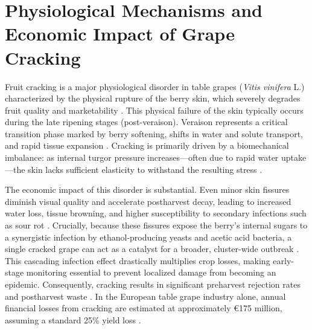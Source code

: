 \section{Physiological Mechanisms and Economic Impact of Grape Cracking}

\medskip
\noindent
Fruit cracking is a major physiological disorder in table grapes (\textit{Vitis vinifera} L.) characterized by the physical rupture of the berry skin, which severely degrades fruit quality and marketability \parencite{horticulturae11111320}. This physical failure of the skin typically occurs during the late ripening stages (post-veraison). Veraison represents a critical transition phase marked by berry softening, shifts in water and solute transport, and rapid tissue expansion \parencite{horticulturae11111320}. Cracking is primarily driven by a biomechanical imbalance: as internal turgor pressure increases---often due to rapid water uptake---the skin lacks sufficient elasticity to withstand the resulting stress \parencite{YU20251506, plants13172400}. 

\medskip
\noindent
The economic impact of this disorder is substantial. Even minor skin fissures diminish visual quality and accelerate postharvest decay, leading to increased water loss, tissue browning, and higher susceptibility to secondary infections such as sour rot \parencite{plants14162462, agronomy12102437}. Crucially, because these fissures expose the berry's internal sugars to a synergistic infection by ethanol-producing yeasts and acetic acid bacteria, a single cracked grape can act as a catalyst for a broader, cluster-wide outbreak \parencite{Hall2018}. This cascading infection effect drastically multiplies crop losses, making early-stage monitoring essential to prevent localized damage from becoming an epidemic. Consequently, cracking results in significant preharvest rejection rates and postharvest waste \parencite{santos2023molecular}. In the European table grape industry alone, annual financial losses from cracking are estimated at approximately €175 million, assuming a standard 25\% yield loss \parencite{CrackSense2022}.

